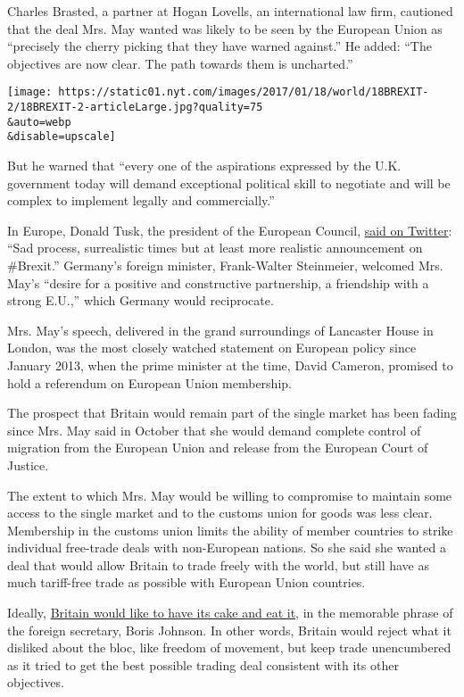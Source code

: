 Charles Brasted, a partner at Hogan Lovells, an international law firm,
cautioned that the deal Mrs. May wanted was likely to be seen by the
European Union as ``precisely the cherry picking that they have warned
against.'' He added: ``The objectives are now clear. The path towards
them is uncharted.''

\texttt{[image: https://static01.nyt.com/images/2017/01/18/world/18BREXIT-2/18BREXIT-2-articleLarge.jpg?quality=75\\\&auto=webp\\\&disable=upscale]}

But he warned that ``every one of the aspirations expressed by the U.K.
government today will demand exceptional political skill to negotiate
and will be complex to implement legally and commercially.''

In Europe, Donald Tusk, the president of the European Council,
\href{https://twitter.com/eucopresident/status/821364567150362624?s=03}{said
on Twitter}: ``Sad process, surrealistic times but at least more
realistic announcement on \#Brexit.'' Germany's foreign minister,
Frank-Walter Steinmeier, welcomed Mrs. May's ``desire for a positive and
constructive partnership, a friendship with a strong E.U.,'' which
Germany would reciprocate.

Mrs. May's speech, delivered in the grand surroundings of Lancaster
House in London, was the most closely watched statement on European
policy since January 2013, when the prime minister at the time, David
Cameron, promised to hold a referendum on European Union membership.

The prospect that Britain would remain part of the single market has
been fading since Mrs. May said in October that she would demand
complete control of migration from the European Union and release from
the European Court of Justice.

The extent to which Mrs. May would be willing to compromise to maintain
some access to the single market and to the customs union for goods was
less clear. Membership in the customs union limits the ability of member
countries to strike individual free-trade deals with non-European
nations. So she said she wanted a deal that would allow Britain to trade
freely with the world, but still have as much tariff-free trade as
possible with European Union countries.

Ideally,
\href{https://www.nytimes.com/2016/11/29/world/europe/uk-brexit-european-union.html}{Britain
would like to have its cake and eat it}, in the memorable phrase of the
foreign secretary, Boris Johnson. In other words, Britain would reject
what it disliked about the bloc, like freedom of movement, but keep
trade unencumbered as it tried to get the best possible trading deal
consistent with its other objectives.

